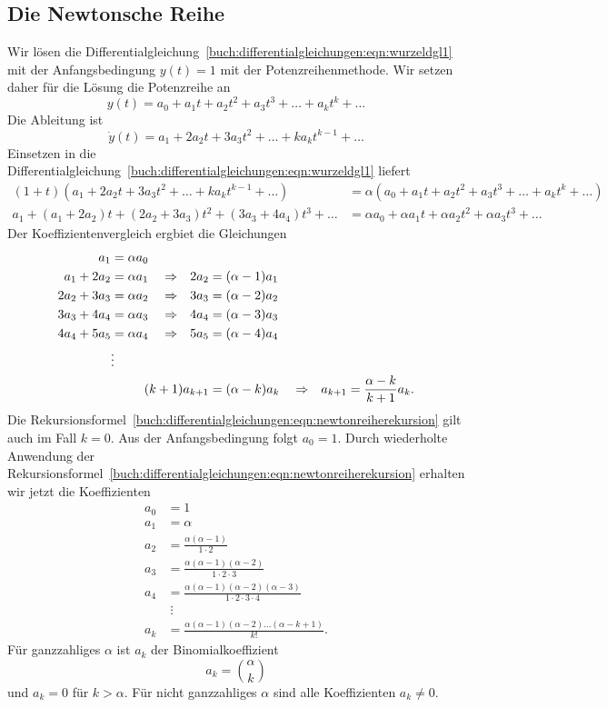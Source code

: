 %
%
\subsection{Die Newtonsche Reihe}
Wir lösen die
Differentialgleichung~\eqref{buch:differentialgleichungen:eqn:wurzeldgl1}
mit der Anfangsbedingung $y(t)=1$ mit der Potenzreihenmethode.
Wir setzen daher für die Lösung die Potenzreihe an
\[
y(t)
=
a_0 + a_1t + a_2t^2 + a_3t^3 + \dots + a_kt^k + \dots
\]
Die Ableitung ist
\[
\dot{y}(t)
=
a_1 + 2a_2t + 3a_3t^2 + \dots  + ka_kt^{k-1} + \dots
\]
Einsetzen in die 
Differentialgleichung~\eqref{buch:differentialgleichungen:eqn:wurzeldgl1}
liefert
\begin{align*}
(1+t)
(
a_1 + 2a_2t + 3a_3t^2 + \dots  + ka_kt^{k-1} + \dots
)
&=
\alpha
(
a_0 + a_1t + a_2t^2 + a_3t^3 + \dots + a_kt^k + \dots
)
\\
a_1
+(a_1+2a_2)t
+(2a_2+3a_3)t^2
+(3a_3+4a_4)t^3
+\dots
&=
\alpha a_0 + \alpha a_1t + \alpha a_2t^2 + \alpha a_3t^3 + \dots
\end{align*}
Der Koeffizientenvergleich ergbiet die Gleichungen
\begin{align}
a_1&=\alpha a_0
\notag
\\
a_1+2a_2 &= \alpha a_1 &&\Rightarrow& 2a_2 &= (\alpha-1) a_1
\notag
\\
2a_2+3a_3 &= \alpha a_2&&\Rightarrow& 3a_3 &= (\alpha-2) a_2
\notag
\\
3a_3+4a_4 &= \alpha a_3&&\Rightarrow& 4a_4 &= (\alpha-3) a_3
\notag
\\
4a_4+5a_5 &= \alpha a_4&&\Rightarrow& 5a_5 &= (\alpha-4) a_4
\notag
\\
&\vdots
\notag
\\
&&&& \llap{$(k+1)a_{k+1}$} &= (\alpha-k) a_k
&&\Rightarrow&
a_{k+1} = \frac{\alpha-k}{k+1}a_k.
\label{buch:differentialgleichungen:eqn:newtonreiherekursion}
\end{align}
Die
Rekursionsformel~\eqref{buch:differentialgleichungen:eqn:newtonreiherekursion}
gilt auch im Fall $k=0$.
Aus der Anfangsbedingung folgt $a_0=1$.
Durch wiederholte Anwendung der 
Rekursionsformel~\eqref{buch:differentialgleichungen:eqn:newtonreiherekursion}
erhalten wir jetzt die Koeffizienten
\begin{align*}
a_0&=1
\\
a_1&=\alpha
\\
a_2&=\frac{\alpha(\alpha-1)}{1\cdot 2}
\\
a_3&=\frac{\alpha(\alpha-1)(\alpha-2)}{1\cdot 2\cdot 3}
\\
a_4&=\frac{\alpha(\alpha-1)(\alpha-2)(\alpha-3)}{1\cdot 2\cdot 3\cdot 4}
\\
&\;\vdots
\\
a_k&=\frac{\alpha(\alpha-1)(\alpha-2)\dots(\alpha-k+1)}{k!}.
\end{align*}
Für ganzzahliges $\alpha$ ist $a_k$ der Binomialkoeffizient
\[
a_k=\binom{\alpha}{k}
\]
und $a_k=0$ für $k>\alpha$.
Für nicht ganzzahliges $\alpha$ sind alle Koeffizienten $a_k\ne 0$.

